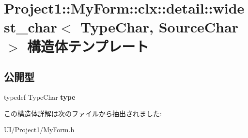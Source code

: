 \hypertarget{struct_project1_1_1_my_form_1_1clx_1_1detail_1_1widest__char}{}\section{Project1\+:\+:My\+Form\+:\+:clx\+:\+:detail\+:\+:widest\+\_\+char$<$ Type\+Char, Source\+Char $>$ 構造体テンプレート}
\label{struct_project1_1_1_my_form_1_1clx_1_1detail_1_1widest__char}
\subsection*{公開型}
\begin{DoxyCompactItemize}
\item 
\mbox{\label{struct_project1_1_1_my_form_1_1clx_1_1detail_1_1widest__char_a4aa71a0d7a47cc56ba9b8520126f8b21}} 
typedef Type\+Char {\bfseries type}
\end{DoxyCompactItemize}


この構造体詳解は次のファイルから抽出されました\+:\begin{DoxyCompactItemize}
\item 
U\+I/\+Project1/My\+Form.\+h\end{DoxyCompactItemize}
